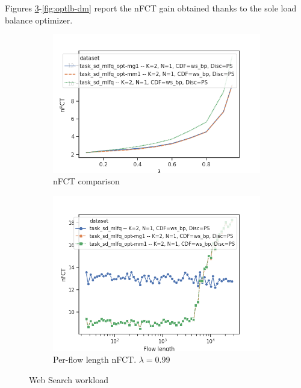 Figures \ref{fig:optlb-ws}-\ref{fig:optlb-dm} report the nFCT gain obtained thanks to the sole load balance optimizer. 
\begin{figure}
	\centering
	\begin{subfigure}{.5\textwidth}
		\centering
		\includegraphics[width=1.05\textwidth]{Chapter3/Figures/ws_ps_comparison}
		\caption{nFCT comparison}
		\label{fig:optlbgain-ws}
	\end{subfigure}%
	\begin{subfigure}{.5\textwidth}
		\centering
		\includegraphics[width=\textwidth]{Chapter3/Figures/ws_ps_detailed.png}
		\caption{Per-flow length nFCT. $\lambda=$0.99}
		\label{fig:optlbgainvsflowsize-ws}
	\end{subfigure}%
	\caption{Web Search workload}
	\label{fig:optlb-ws}
\end{figure}%
